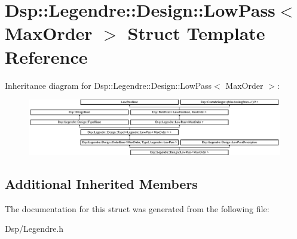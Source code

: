 \hypertarget{structDsp_1_1Legendre_1_1Design_1_1LowPass}{\section{Dsp\-:\-:Legendre\-:\-:Design\-:\-:Low\-Pass$<$ Max\-Order $>$ Struct Template Reference}
\label{structDsp_1_1Legendre_1_1Design_1_1LowPass}
}
Inheritance diagram for Dsp\-:\-:Legendre\-:\-:Design\-:\-:Low\-Pass$<$ Max\-Order $>$\-:\begin{figure}[H]
\begin{center}
\leavevmode
\includegraphics[height=2.456140cm]{structDsp_1_1Legendre_1_1Design_1_1LowPass}
\end{center}
\end{figure}
\subsection*{Additional Inherited Members}


The documentation for this struct was generated from the following file\-:\begin{DoxyCompactItemize}
\item 
Dsp/Legendre.\-h\end{DoxyCompactItemize}
